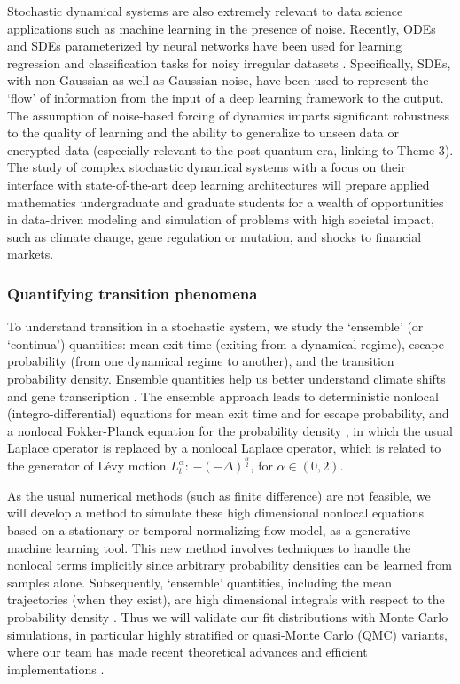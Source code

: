 \documentclass[11pt]{NSFamsart}
\begin{document}
 
Stochastic dynamical systems are also extremely relevant to data science applications such as machine learning in the presence of  noise. Recently, ODEs and SDEs parameterized by neural networks have been used for learning regression and classification tasks for noisy irregular datasets \cite{chen2018neural,rubanova2019latent,jia2019neural,tzen2019neural,look2020deterministic,liu2019neural}. Specifically, SDEs, with non-Gaussian as well as Gaussian noise, have been used to represent the `flow' of information from the input of a deep learning framework to the output. The assumption of noise-based forcing of dynamics imparts significant robustness to the quality of learning and the ability to generalize to unseen data or encrypted data (especially relevant to the post-quantum era, linking to Theme 3). The study of complex stochastic dynamical systems with a focus on their interface with state-of-the-art deep learning architectures will prepare applied mathematics undergraduate and graduate students for a wealth of opportunities in data-driven modeling and simulation of problems with high societal impact, such as climate change, gene regulation or mutation, and shocks to financial markets.

\subsubsection*{Quantifying transition phenomena}
To understand transition in a stochastic system, we study the `ensemble' (or `continua') quantities: mean exit time (exiting from a dynamical regime), escape probability (from one dynamical regime to another), and  the transition  probability density. Ensemble quantities help us better understand  climate shifts \cite{ZhengYY2020} and  gene transcription \cite{ChenWuDuan}. 
The ensemble approach leads to deterministic  nonlocal (integro-differential) equations for mean exit time and for escape probability, and a nonlocal Fokker-Planck equation for the probability density \cite{DuanBook2015},
in which the usual Laplace operator is replaced
by a nonlocal Laplace operator, which is related to the generator of L\'evy motion $L_t^\alpha$:  $-(-\Delta)^{\frac{\alpha}2  }$, for $\alpha \in (0, 2)$.
 
 
As the usual numerical methods (such as finite difference) are not feasible, we will develop a method to simulate these high dimensional nonlocal equations based on a stationary or temporal normalizing flow model, as a  generative machine learning tool.  This new method involves techniques to handle the nonlocal terms implicitly since arbitrary probability densities can be learned from samples alone. Subsequently, `ensemble' quantities, including the mean trajectories (when they exist), are high dimensional integrals with respect to the probability density \cite{DuanBook2015}.  Thus we will validate our fit distributions with Monte Carlo simulations, in particular highly stratified or quasi-Monte Carlo (QMC) variants, where our team has made recent theoretical advances \cite{Hic17a, HicEtal17a} and efficient implementations \cite{QMCPy2020a,ChoEtal22a}.
\end{document}
